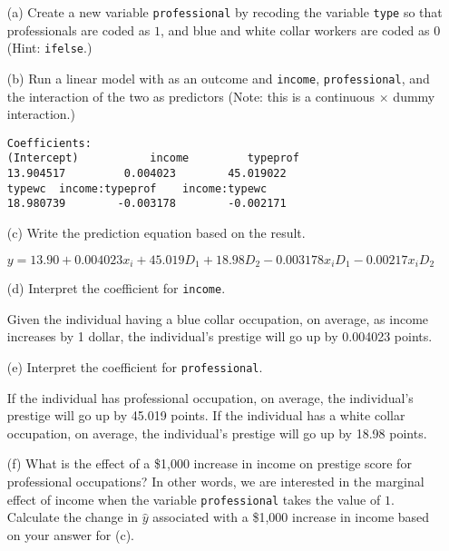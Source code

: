 \documentclass[12pt,letterpaper]{article}
\begin{document}
\newpage
\begin{enumerate}
	
	\item [(a)]
	Create a new variable \texttt{professional} by recoding the variable \texttt{type} so that professionals are coded as $1$, and blue and white collar workers are coded as $0$ (Hint: \texttt{ifelse}.)
	
	\vspace{3cm}
	
	
	\item [(b)]
	Run a linear model with  as an outcome and \texttt{income}, \texttt{professional}, and the interaction of the two as predictors (Note: this is a continuous $\times$ dummy interaction.)
		
\begin{verbatim}
Coefficients:
(Intercept)           income         typeprof  
13.904517         0.004023        45.019022  
typewc  income:typeprof    income:typewc  
18.980739        -0.003178        -0.002171  
\end{verbatim} 
	\vspace{3cm}
	\item [(c)]
	Write the prediction equation based on the result.
	
	$y=13.90 + 0.004023x_{i} +45.019D_{1}+ 18.98D_{2}-0.003178 x_{i}D_{1} - 0.00217x_{i}D_{2}$
	
\newpage
	\item [(d)]
	Interpret the coefficient for \texttt{income}.
	
	Given the individual having a blue collar occupation, on average, as income increases by 1 dollar, the individual's prestige will go up by 0.004023 points. 
	
	\vspace{3cm}	
	\item [(e)]
	Interpret the coefficient for \texttt{professional}.
	
	If the individual has professional occupation, on average, the individual's prestige will go up by 45.019 points. 
	If the individual has a white collar occupation, on average, the individual's prestige will go up by 18.98 points. 
	
	
	\newpage
	\item [(f)]
	What is the effect of a \$1,000 increase in income on prestige score for professional occupations? In other words, we are interested in the marginal effect of income when the variable \texttt{professional} takes the value of $1$. Calculate the change in $\hat{y}$ associated with a \$1,000 increase in income based on your answer for (c).
	

\end{enumerate}
\end{document}
